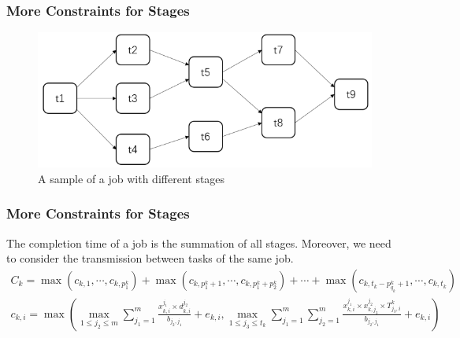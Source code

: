 \begin{frame}
\frametitle{More Constraints for Stages}
\begin{figure}[h]
    \centering
    \includegraphics[height=0.5\textheight]{img/samplegraph.png}
    \caption{A sample of a job with different stages}
    \label{fig:sample}
\end{figure}
\end{frame}

\begin{frame}
\frametitle{More Constraints for Stages}
    The completion time of a job is the summation of all stages. Moreover, we need to consider the transmission between tasks of the same job.
\begin{align}
    C_k=\max(c_{k,1},\cdots,c_{k,p_1^k})+\max(c_{k,p_1^k+1},\cdots,c_{k,p_1^k+p_2^k})+\cdots+\max(c_{k,t_k-p_{q_k}^k+1},\cdots,c_{k,t_k}) \label{eq:stage}\\
    c_{k,i}=\max\left(\max\limits_{1\leq j_2\leq m}\sum_{j_1=1}^m\frac{x_{k,i}^{j_1}\times d_{k,i}^{j_2}}{b_{j_2,j_1}}+e_{k,i},\max\limits_{1\leq j_3\leq t_k}\sum_{j_1=1}^m\sum_{j_2=1}^m\frac{x_{k,i}^{j_1}\times x_{k,j_3}^{j_2}\times T_{j_3,i}^k}{b_{j_2,j_1}}+e_{k,i}\right) \label{eq:taske}
\end{align}
\end{frame}

